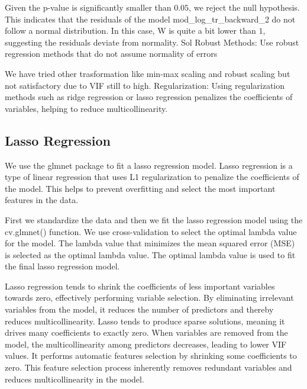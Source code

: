 \documentclass[
]{article}
\begin{document}
Given the p-value is significantly smaller than \(0.05\), we reject the
null hypothesis. This indicates that the residuals of the model
mod\_log\_tr\_backward\_2 do not follow a normal distribution. In this
case, W is quite a bit lower than \(1\), suggesting the residuals
deviate from normality. Sol Robust Methods: Use robust regression
methods that do not assume normality of errors

We have tried other trasformation like min-max scaling and robust
scaling but not satisfactory due to VIF still to high. Regularization:
Using regularization methods such as ridge regression or lasso
regression penalizes the coefficients of variables, helping to reduce
multicollinearity.

\subsection{Lasso Regression}\label{lasso-regression}

We use the glmnet package to fit a lasso regression model. Lasso
regression is a type of linear regression that uses L1 regularization to
penalize the coefficients of the model. This helps to prevent
overfitting and select the most important features in the data.

First we standardize the data and then we fit the lasso regression model
using the cv.glmnet() function. We use cross-validation to select the
optimal lambda value for the model. The lambda value that minimizes the
mean squared error (MSE) is selected as the optimal lambda value. The
optimal lambda value is used to fit the final lasso regression model.

Lasso regression tends to shrink the coefficients of less important
variables towards zero, effectively performing variable selection. By
eliminating irrelevant variables from the model, it reduces the number
of predictors and thereby reduces multicollinearity. Lasso tends to
produce sparse solutions, meaning it drives many coefficients to exactly
zero. When variables are removed from the model, the multicollinearity
among predictors decreases, leading to lower VIF values. It performs
automatic features selection by shrinking some coefficients to zero.
This feature selection process inherently removes redundant variables
and reduces multicollinearity in the model.
\end{document}
